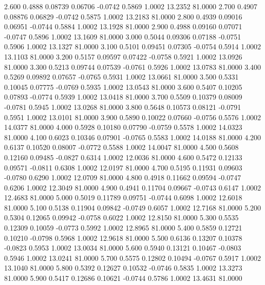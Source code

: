    2.600   0.4888   0.08739   0.06706  -0.0742   0.5869   1.0002  13.2352  81.0000
   2.700   0.4907   0.08876   0.06829  -0.0742   0.5875   1.0002  13.2183  81.0000
   2.800   0.4939   0.09016   0.06951  -0.0744   0.5884   1.0002  13.1928  81.0000
   2.900   0.4988   0.09160   0.07071  -0.0747   0.5896   1.0002  13.1609  81.0000
   3.000   0.5044   0.09306   0.07188  -0.0751   0.5906   1.0002  13.1327  81.0000
   3.100   0.5101   0.09451   0.07305  -0.0754   0.5914   1.0002  13.1103  81.0000
   3.200   0.5157   0.09597   0.07422  -0.0758   0.5921   1.0002  13.0926  81.0000
   3.300   0.5213   0.09744   0.07539  -0.0761   0.5926   1.0002  13.0783  81.0000
   3.400   0.5269   0.09892   0.07657  -0.0765   0.5931   1.0002  13.0661  81.0000
   3.500   0.5331   0.10045   0.07775  -0.0769   0.5935   1.0002  13.0543  81.0000
   3.600   0.5407   0.10205   0.07893  -0.0774   0.5939   1.0002  13.0418  81.0000
   3.700   0.5509   0.10379   0.08009  -0.0781   0.5945   1.0002  13.0268  81.0000
   3.800   0.5648   0.10573   0.08121  -0.0791   0.5951   1.0002  13.0101  81.0000
   3.900   0.5890   0.10022   0.07660  -0.0756   0.5576   1.0002  14.0377  81.0000
   4.000   0.5928   0.10180   0.07790  -0.0759   0.5578   1.0002  14.0323  81.0000
   4.100   0.6023   0.10346   0.07901  -0.0765   0.5583   1.0002  14.0188  81.0000
   4.200   0.6137   0.10520   0.08007  -0.0772   0.5588   1.0002  14.0047  81.0000
   4.500   0.5608   0.12160   0.09485  -0.0827   0.6314   1.0002  12.0036  81.0000
   4.600   0.5472   0.12133   0.09571  -0.0811   0.6308   1.0002  12.0197  81.0000
   4.700   0.5195   0.11931   0.09603  -0.0780   0.6290   1.0002  12.0709  81.0000
   4.800   0.4918   0.11662   0.09594  -0.0747   0.6206   1.0002  12.3049  81.0000
   4.900   0.4941   0.11704   0.09667  -0.0743   0.6147   1.0002  12.4683  81.0000
   5.000   0.5019   0.11789   0.09751  -0.0744   0.6098   1.0002  12.6018  81.0000
   5.100   0.5138   0.11904   0.09842  -0.0749   0.6057   1.0002  12.7168  81.0000
   5.200   0.5304   0.12065   0.09942  -0.0758   0.6022   1.0002  12.8150  81.0000
   5.300   0.5535   0.12309   0.10059  -0.0773   0.5992   1.0002  12.8965  81.0000
   5.400   0.5859   0.12721   0.10210  -0.0798   0.5968   1.0002  12.9618  81.0000
   5.500   0.6136   0.13207   0.10378  -0.0823   0.5953   1.0002  13.0034  81.0000
   5.600   0.5940   0.13121   0.10467  -0.0803   0.5946   1.0002  13.0241  81.0000
   5.700   0.5575   0.12802   0.10494  -0.0767   0.5917   1.0002  13.1040  81.0000
   5.800   0.5392   0.12627   0.10532  -0.0746   0.5835   1.0002  13.3273  81.0000
   5.900   0.5417   0.12686   0.10621  -0.0744   0.5786   1.0002  13.4631  81.0000
